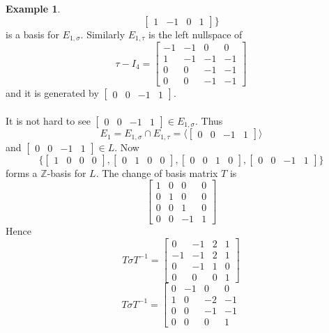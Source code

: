 \documentclass{article}
\theoremstyle{plain}
\theoremstyle{definition}
\newtheorem{example}[theorem]{Example}
\newcommand{\Z}{\ensuremath{\mathbb{Z}}}
\begin{document}
\begin{example}
\begin{displaymath}
\begin{bmatrix}
1& -1 &0 &1
\end{bmatrix}
\rbrace
\end{displaymath}
is a basis for $E_{1,\sigma}$. Similarly $E_{1,\tau}$ is the left nullspace of 
$$\tau - I_4 = \left[ \begin {array}{cccc} -1&-1&0&0\\ 1&-1&-1&-1
\\ 0&0&-1&-1\\ 0&0&-1&-1\end {array}
 \right]$$ and it is generated by $\begin{bmatrix}
0& 0 &-1 &1
\end{bmatrix}$.\\
\\It is not hard to see $\begin{bmatrix}
0& 0 &-1 &1
\end{bmatrix}\in E_{1,\sigma}$. Thus $$E_1 = E_{1,\sigma} \cap E_{1,\tau} = \langle \begin{bmatrix}
0& 0 &-1 &1
\end{bmatrix} \rangle$$
and $ \begin{bmatrix}
0& 0 &-1 &1
\end{bmatrix}\in L$. Now $$\lbrace  \begin{bmatrix}
1& 0 &0 &0
\end{bmatrix} ,  \begin{bmatrix}
0& 1 &0 &0
\end{bmatrix},  \begin{bmatrix}
0& 0 &1 &0
\end{bmatrix},  \begin{bmatrix}
0& 0 &-1 &1
\end{bmatrix} \rbrace$$ forms a $\Z$-basis for $L$. The change of basis matrix $T$ is 
$$
\begin{bmatrix}
1 & 0 &0 &0\\
0 & 1 &0 &0\\
0 & 0 &1 &0\\
0 & 0 &-1 &1
\end{bmatrix}
$$ Hence 
$$
T \sigma T^{-1}= \left[ \begin {array}{ccc|c} 0&-1&2&1\\ -1&-1&2&1
\\ 0&-1&1&0\\ \hline 0&0&0&1\end {array}
 \right] 
$$
$$
T\sigma T^{-1}=  \left[ \begin {array}{ccc|c} 0&-1&0&0\\ 1&0&-2&-1
\\ 0&0&-1&-1\\ \hline 0&0&0&1\end {array}
$$
\end{example}
\end{document}
